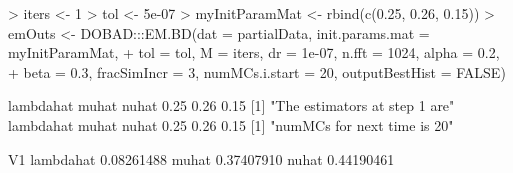 \documentclass[12pt]{article}
\begin{document}



\begin{Schunk}
\begin{Sinput}
> iters <- 1
> tol <- 5e-07
> myInitParamMat <- rbind(c(0.25, 0.26, 0.15))
> emOuts <- DOBAD:::EM.BD(dat = partialData, init.params.mat = myInitParamMat, 
+    tol = tol, M = iters, dr = 1e-07, n.fft = 1024, alpha = 0.2, 
+    beta = 0.3, fracSimIncr = 3, numMCs.i.start = 20, outputBestHist = FALSE)
\end{Sinput}
\begin{Soutput}
lambdahat     muhat     nuhat 
     0.25      0.26      0.15 
[1] "The estimators at step 1 are"
lambdahat     muhat     nuhat 
     0.25      0.26      0.15 
[1] "numMCs for next time is  20"
\end{Soutput}
\begin{Soutput}
                  V1
lambdahat 0.08261488
muhat     0.37407910
nuhat     0.44190461
\end{Soutput}
\end{Schunk}


\end{document}

